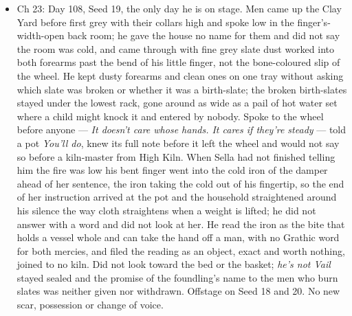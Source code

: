 \documentclass{design/chronicle}
\begin{document}
{\begin{itemize}[leftmargin=1.4em,itemsep=1pt,topsep=3pt,parsep=0pt]
\item Ch 23: Day 108, Seed 19, the only day he is on stage. Men came up the Clay Yard before first grey with their collars high and spoke low in the finger’s-width-open back room; he gave the house no name for them and did not say the room was cold, and came through with fine grey slate dust worked into both forearms past the bend of his little finger, not the bone-coloured slip of the wheel. He kept dusty forearms and clean ones on one tray without asking which slate was broken or whether it was a birth-slate; the broken birth-slates stayed under the lowest rack, gone around as wide as a pail of hot water set where a child might knock it and entered by nobody. Spoke to the wheel before anyone — \emph{It doesn’t care whose hands. It cares if they’re steady} — told a pot \emph{You’ll do}, knew its full note before it left the wheel and would not say so before a kiln-master from High Kiln. When Sella had not finished telling him the fire was low his bent finger went into the cold iron of the damper ahead of her sentence, the iron taking the cold out of his fingertip, so the end of her instruction arrived at the pot and the household straightened around his silence the way cloth straightens when a weight is lifted; he did not answer with a word and did not look at her. He read the iron as the bite that holds a vessel whole and can take the hand off a man, with no Grathic word for both mercies, and filed the reading as an object, exact and worth nothing, joined to no kiln. Did not look toward the bed or the basket; \emph{he’s not Vail} stayed sealed and the promise of the foundling’s name to the men who burn slates was neither given nor withdrawn. Offstage on Seed 18 and 20. No new scar, possession or change of voice.

\end{itemize}

\begin{itemize}[leftmargin=1.4em,itemsep=1pt,topsep=3pt,parsep=0pt]


\end{itemize}}
\end{document}
